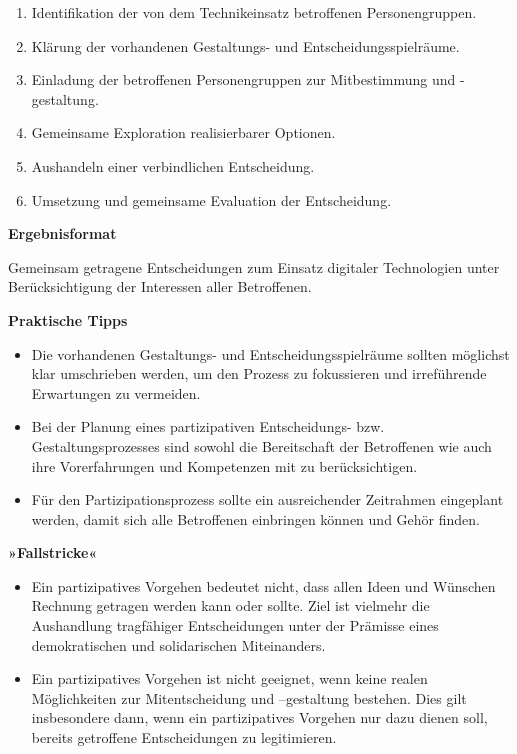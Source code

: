 \documentclass[
  a4paper,
]{book}
\providecommand{\tightlist}{%
  \setlength{\itemsep}{0pt}\setlength{\parskip}{0pt}}
\begin{document}
\begin{enumerate}
\def\labelenumi{\arabic{enumi}.}
\tightlist
\item
  Identifikation der von dem Technikeinsatz betroffenen Personengruppen.
\item
  Klärung der vorhandenen Gestaltungs- und Entscheidungsspielräume.
\item
  Einladung der betroffenen Personengruppen zur Mitbestimmung und -gestaltung.
\item
  Gemeinsame Exploration realisierbarer Optionen.
\item
  Aushandeln einer verbindlichen Entscheidung.
\item
  Umsetzung und gemeinsame Evaluation der Entscheidung.
\end{enumerate}

\textbf{Ergebnisformat}

Gemeinsam getragene Entscheidungen zum Einsatz digitaler Technologien unter Berücksichtigung der Interessen aller Betroffenen.

\textbf{Praktische Tipps}

\begin{itemize}
\tightlist
\item
  Die vorhandenen Gestaltungs- und Entscheidungsspielräume sollten möglichst klar umschrieben werden, um den Prozess zu fokussieren und irreführende Erwartungen zu vermeiden.
\item
  Bei der Planung eines partizipativen Entscheidungs- bzw. Gestaltungsprozesses sind sowohl die Bereitschaft der Betroffenen wie auch ihre Vorerfahrungen und Kompetenzen mit zu berücksichtigen.
\item
  Für den Partizipationsprozess sollte ein ausreichender Zeitrahmen eingeplant werden, damit sich alle Betroffenen einbringen können und Gehör finden.
\end{itemize}

\textbf{»Fallstricke«}

\begin{itemize}
\tightlist
\item
  Ein partizipatives Vorgehen bedeutet nicht, dass allen Ideen und Wünschen Rechnung getragen werden kann oder sollte. Ziel ist vielmehr die Aushandlung tragfähiger Entscheidungen unter der Prämisse eines demokratischen und solidarischen Miteinanders.
\item
  Ein partizipatives Vorgehen ist nicht geeignet, wenn keine realen Möglichkeiten zur Mitentscheidung und --gestaltung bestehen. Dies gilt insbesondere dann, wenn ein partizipatives Vorgehen nur dazu dienen soll, bereits getroffene Entscheidungen zu legitimieren.
\end{itemize}
\end{document}

